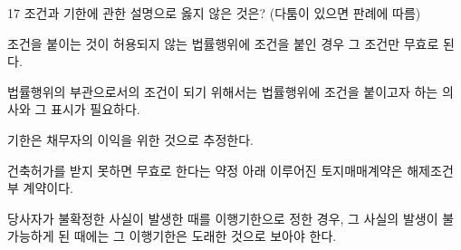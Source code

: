 \begin{question}{17}
조건과 기한에 관한 설명으로 옳지 않은 것은? (다툼이 있으면 판례에 따름)
\begin{choices}
  \item 조건을 붙이는 것이 허용되지 않는 법률행위에 조건을 붙인 경우 그 조건만 무효로 된다.
  \item 법률행위의 부관으로서의 조건이 되기 위해서는 법률행위에 조건을 붙이고자 하는 의사와 그 표시가 필요하다.
  \item 기한은 채무자의 이익을 위한 것으로 추정한다.
  \item 건축허가를 받지 못하면 무효로 한다는 약정 아래 이루어진 토지매매계약은 해제조건부 계약이다.
  \item 당사자가 불확정한 사실이 발생한 때를 이행기한으로 정한 경우, 그 사실의 발생이 불가능하게 된 때에는 그 이행기한은 도래한 것으로 보아야 한다.
\end{choices}
\end{question}
